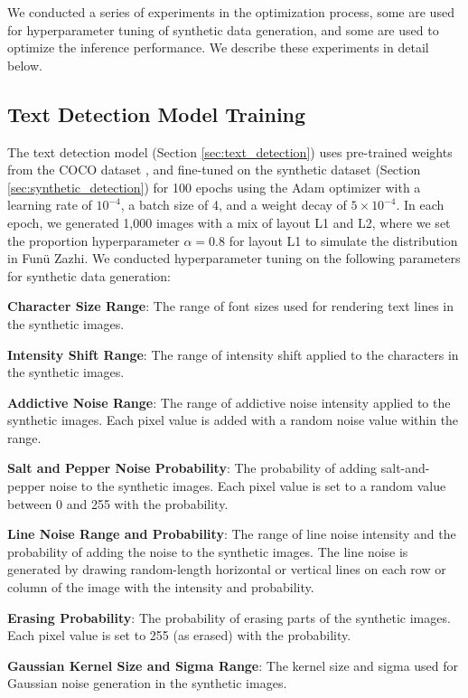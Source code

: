 \documentclass[12pt,twoside]{report}
\begin{document}
We conducted a series of experiments in the optimization process, some are used for hyperparameter tuning of synthetic data generation, and some are used to optimize the inference performance. We describe these experiments in detail below.

\subsection{Text Detection Model Training}
\label{sec:text_detection_training}
The text detection model (Section \ref{sec:text_detection}) uses pre-trained weights from the COCO dataset \cite{lin2014coco}, and fine-tuned on the synthetic dataset (Section \ref{sec:synthetic_detection}) for 100 epochs using the Adam optimizer \cite{adamoptimizer} with a learning rate of $10^{-4}$, a batch size of 4, and a weight decay of $5 \times 10^{-4}$. In each epoch, we generated 1,000 images with a mix of layout L1 and L2, where we set the proportion hyperparameter $\alpha=0.8$ for layout L1 to simulate the distribution in Funü Zazhi. We conducted hyperparameter tuning on the following parameters for synthetic data generation:

\textbf{Character Size Range}: The range of font sizes used for rendering text lines in the synthetic images.

\textbf{Intensity Shift Range}: The range of intensity shift applied to the characters in the synthetic images.

\textbf{Addictive Noise Range}: The range of addictive noise intensity applied to the synthetic images. Each pixel value is added with a random noise value within the range.

\textbf{Salt and Pepper Noise Probability}: The probability of adding salt-and-pepper noise to the synthetic images. Each pixel value is set to a random value between 0 and 255 with the probability.

\textbf{Line Noise Range and Probability}: The range of line noise intensity and the probability of adding the noise to the synthetic images. The line noise is generated by drawing random-length horizontal or vertical lines on each row or column of the image with the intensity and probability.

\textbf{Erasing Probability}: The probability of erasing parts of the synthetic images. Each pixel value is set to 255 (as erased) with the probability.

\textbf{Gaussian Kernel Size and Sigma Range}: The kernel size and sigma used for Gaussian noise generation in the synthetic images.
\end{document}
